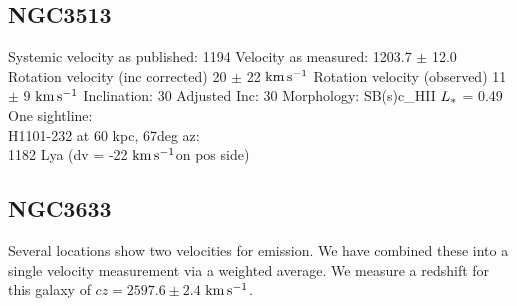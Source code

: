 \documentclass[iop]{emulateapj-rtx4}
\newcommand{\kms}{$\rm km\, s^{-1}$}
\begin{document}

%
%
%
%
%




\subsection{NGC3513}
Systemic velocity as published: 1194
Velocity as measured: 1203.7 $\pm$ 12.0
Rotation velocity (inc corrected) 20 $\pm$ 22 \kms
Rotation velocity (observed) 11 $\pm$ 9 \kms
Inclination: 30
Adjusted Inc: 30
Morphology: SB(s)c\_HII
$L_{\**}$ = 0.49 \\

One sightline: \\
H1101-232 at 60 kpc, 67deg az: \\
1182 Lya (dv = -22 \kms on pos side)


\subsection{NGC3633}
Several locations show two velocities for emission. We have combined these into a single velocity measurement via a weighted average. We measure a redshift for this galaxy of $cz = 2597.6 \pm 2.4$ \kms.
\end{document}
